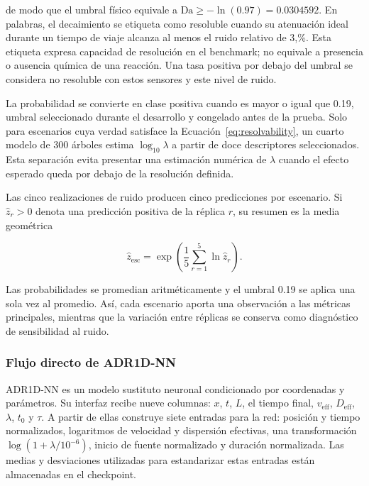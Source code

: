 \documentclass[11pt,a4paper]{article}
\begin{document}
de modo que el umbral físico equivale a
$\mathrm{Da}\geq-\ln(0.97)=0.0304592$. En palabras, el decaimiento se etiqueta
como resoluble cuando su atenuación ideal durante un tiempo de viaje alcanza al
menos el ruido relativo de 3,\%. Esta etiqueta expresa capacidad de resolución
en el benchmark; no equivale a presencia o ausencia química de una reacción.
Una tasa positiva por debajo del umbral se considera no resoluble con estos
sensores y este nivel de ruido.

La probabilidad se convierte en clase positiva cuando es mayor o igual que
0.19, umbral seleccionado durante el desarrollo y congelado antes de la prueba.
Solo para escenarios cuya verdad satisface la
Ecuación~\eqref{eq:resolvability}, un cuarto modelo de 300 árboles estima
$\log_{10}\lambda$ a partir de doce descriptores seleccionados. Esta separación
evita presentar una estimación numérica de $\lambda$ cuando el efecto esperado
queda por debajo de la resolución definida.

Las cinco realizaciones de ruido producen cinco predicciones por escenario. Si
$\widehat z_r>0$ denota una predicción positiva de la réplica $r$, su resumen es
la media geométrica

\begin{equation}
\widehat z_{\mathrm{esc}}
=\exp\!\left(\frac{1}{5}\sum_{r=1}^{5}\ln\widehat z_r\right).
\end{equation}

Las probabilidades se promedian aritméticamente y el umbral 0.19 se aplica una
sola vez al promedio. Así, cada escenario aporta una observación a las métricas
principales, mientras que la variación entre réplicas se conserva como
diagnóstico de sensibilidad al ruido.

\subsubsection{Flujo directo de ADR1D-NN}

ADR1D-NN es un modelo sustituto neuronal condicionado por coordenadas y
parámetros. Su interfaz recibe nueve columnas: $x$, $t$, $L$, el tiempo final,
$v_{\mathrm{eff}}$, $D_{\mathrm{eff}}$, $\lambda$, $t_0$ y $\tau$. A partir de
ellas construye siete entradas para la red: posición y tiempo normalizados,
logaritmos de velocidad y dispersión efectivas, una transformación
$\log(1+\lambda/10^{-6})$, inicio de fuente normalizado y duración normalizada.
Las medias y desviaciones utilizadas para estandarizar estas entradas están
almacenadas en el checkpoint.
\end{document}
